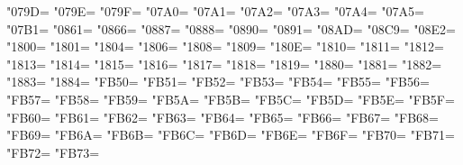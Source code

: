 \XeTeXcharclass"079D=\KclassArabU
\XeTeXcharclass"079E=\KclassArabU
\XeTeXcharclass"079F=\KclassArabU
\XeTeXcharclass"07A0=\KclassArabU
\XeTeXcharclass"07A1=\KclassArabU
\XeTeXcharclass"07A2=\KclassArabU
\XeTeXcharclass"07A3=\KclassArabU
\XeTeXcharclass"07A4=\KclassArabU
\XeTeXcharclass"07A5=\KclassArabU
\XeTeXcharclass"07B1=\KclassArabU
\XeTeXcharclass"0861=\KclassArabU
\XeTeXcharclass"0866=\KclassArabU
\XeTeXcharclass"0887=\KclassArabU
\XeTeXcharclass"0888=\KclassArabU
\XeTeXcharclass"0890=\KclassArabU
\XeTeXcharclass"0891=\KclassArabU
\XeTeXcharclass"08AD=\KclassArabU
\XeTeXcharclass"08C9=\KclassArabU
\XeTeXcharclass"08E2=\KclassArabU
\XeTeXcharclass"1800=\KclassArabU
\XeTeXcharclass"1801=\KclassArabU
\XeTeXcharclass"1804=\KclassArabU
\XeTeXcharclass"1806=\KclassArabU
\XeTeXcharclass"1808=\KclassArabU
\XeTeXcharclass"1809=\KclassArabU
\XeTeXcharclass"180E=\KclassArabU
\XeTeXcharclass"1810=\KclassArabU
\XeTeXcharclass"1811=\KclassArabU
\XeTeXcharclass"1812=\KclassArabU
\XeTeXcharclass"1813=\KclassArabU
\XeTeXcharclass"1814=\KclassArabU
\XeTeXcharclass"1815=\KclassArabU
\XeTeXcharclass"1816=\KclassArabU
\XeTeXcharclass"1817=\KclassArabU
\XeTeXcharclass"1818=\KclassArabU
\XeTeXcharclass"1819=\KclassArabU
\XeTeXcharclass"1880=\KclassArabU
\XeTeXcharclass"1881=\KclassArabU
\XeTeXcharclass"1882=\KclassArabU
\XeTeXcharclass"1883=\KclassArabU
\XeTeXcharclass"1884=\KclassArabU
\XeTeXcharclass"FB50=\KclassArabU
\XeTeXcharclass"FB51=\KclassArabU
\XeTeXcharclass"FB52=\KclassArabU
\XeTeXcharclass"FB53=\KclassArabU
\XeTeXcharclass"FB54=\KclassArabU
\XeTeXcharclass"FB55=\KclassArabU
\XeTeXcharclass"FB56=\KclassArabU
\XeTeXcharclass"FB57=\KclassArabU
\XeTeXcharclass"FB58=\KclassArabU
\XeTeXcharclass"FB59=\KclassArabU
\XeTeXcharclass"FB5A=\KclassArabU
\XeTeXcharclass"FB5B=\KclassArabU
\XeTeXcharclass"FB5C=\KclassArabU
\XeTeXcharclass"FB5D=\KclassArabU
\XeTeXcharclass"FB5E=\KclassArabU
\XeTeXcharclass"FB5F=\KclassArabU
\XeTeXcharclass"FB60=\KclassArabU
\XeTeXcharclass"FB61=\KclassArabU
\XeTeXcharclass"FB62=\KclassArabU
\XeTeXcharclass"FB63=\KclassArabU
\XeTeXcharclass"FB64=\KclassArabU
\XeTeXcharclass"FB65=\KclassArabU
\XeTeXcharclass"FB66=\KclassArabU
\XeTeXcharclass"FB67=\KclassArabU
\XeTeXcharclass"FB68=\KclassArabU
\XeTeXcharclass"FB69=\KclassArabU
\XeTeXcharclass"FB6A=\KclassArabU
\XeTeXcharclass"FB6B=\KclassArabU
\XeTeXcharclass"FB6C=\KclassArabU
\XeTeXcharclass"FB6D=\KclassArabU
\XeTeXcharclass"FB6E=\KclassArabU
\XeTeXcharclass"FB6F=\KclassArabU
\XeTeXcharclass"FB70=\KclassArabU
\XeTeXcharclass"FB71=\KclassArabU
\XeTeXcharclass"FB72=\KclassArabU
\XeTeXcharclass"FB73=\KclassArabU

